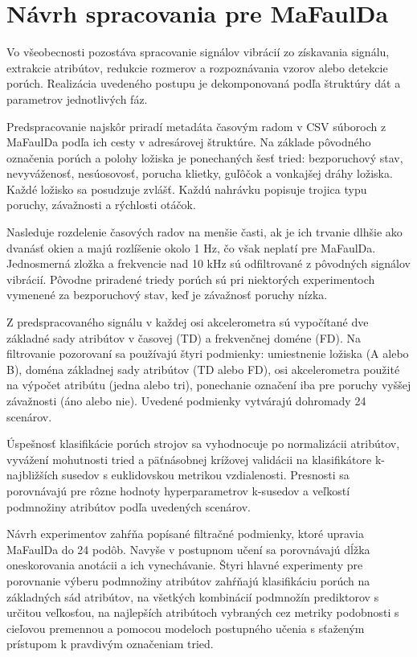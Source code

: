 \section{Návrh spracovania pre MaFaulDa}
Vo všeobecnosti pozostáva spracovanie signálov vibrácií zo získavania signálu, extrakcie atribútov, redukcie rozmerov a rozpoznávania vzorov alebo detekcie porúch. Realizácia uvedeného postupu je dekomponovaná podľa štruktúry dát a parametrov jednotlivých fáz. 

Predspracovanie najskôr priradí metadáta časovým radom v CSV súboroch z MaFaulDa podľa ich cesty v adresárovej štruktúre. Na základe pôvodného označenia porúch a polohy ložiska je ponechaných šesť tried: bezporuchový stav, nevyváženosť, nesúosovosť, porucha klietky, guľôčok a vonkajšej dráhy ložiska. Každé ložisko sa posudzuje zvlášť. Každú nahrávku popisuje trojica typu poruchy, závažnosti a rýchlosti otáčok. 

Nasleduje rozdelenie časových radov na menšie časti, ak je ich trvanie dlhšie ako dvanásť okien a majú rozlíšenie okolo 1 Hz, čo však neplatí pre MaFaulDa. Jednosmerná zložka a frekvencie nad 10 kHz sú odfiltrované z pôvodných signálov vibrácií. Pôvodne priradené triedy porúch sú pri niektorých experimentoch vymenené za bezporuchový stav, keď je závažnosť poruchy nízka. 

Z predspracovaného signálu v každej osi akcelerometra sú vypočítané dve základné sady atribútov v časovej (TD) a frekvenčnej doméne (FD). Na filtrovanie pozorovaní sa používajú štyri podmienky: umiestnenie ložiska (A alebo B), doména základnej sady atribútov (TD alebo FD), osi akcelerometra použité na výpočet atribútu (jedna alebo tri), ponechanie označení iba pre poruchy vyššej závažnosti (áno alebo nie). Uvedené podmienky vytvárajú dohromady 24 scenárov. 

Úspešnosť klasifikácie porúch strojov sa vyhodnocuje po normalizácii atribútov, vyvážení mohutnosti tried a päťnásobnej krížovej validácii na klasifikátore k-najbližších susedov s euklidovskou metrikou vzdialenosti. Presnosti sa porovnávajú pre rôzne hodnoty hyperparametrov k-susedov a veľkostí podmnožiny atribútov podľa uvedených scenárov.

Návrh experimentov zahŕňa popísané filtračné podmienky, ktoré upravia MaFaulDa do 24 podôb. Navyše v postupnom učení sa porovnávajú dĺžka oneskorovania anotácii a ich vynechávanie. Štyri hlavné experimenty pre porovnanie výberu podmnožiny atribútov zahŕňajú klasifikáciu porúch na základných sád atribútov, na všetkých kombinácií podmnožín prediktorov s určitou veľkosťou, na najlepších atribútoch vybraných cez metriky podobnosti s cieľovou premennou a pomocou modeloch postupného učenia s sťaženým prístupom k pravdivým označeniam tried.  

